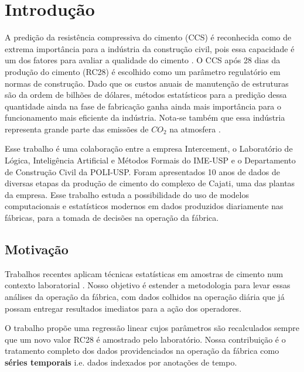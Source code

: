 \chapter{Introdução}
\label{cap:introducao}


A predição da resistência compressiva do cimento (CCS) é reconhecida como de
extrema importância para a indústria da construção civil, pois essa
capacidade é um dos fatores para avaliar a qualidade do cimento
\citep{cementml}. O CCS após 28 dias da produção do cimento (RC28) é escolhido
 como um parâmetro regulatório em normas de construção. Dado que os custos
 anuais de manutenção de estruturas são da ordem de bilhões de dólares, métodos
 estatísticos para a predição dessa quantidade ainda na fase de fabricação ganha ainda mais importância para o
 funcionamento mais eficiente da indústria. Nota-se também que essa  
 indústria representa grande parte das emissões de $CO_2$ na atmosfera \citep{cementroadmap}.

Esse trabalho é uma colaboração entre a empresa Intercement, o Laboratório de
Lógica, Inteligência Artificial e Métodos Formais do IME-USP e o Departamento de
Construção Civil da POLI-USP. Foram apresentados
10 anos de dados de diversas etapas da produção de cimento do complexo de
Cajati, uma das plantas da empresa. Esse trabalho estuda a possibilidade do uso
de modelos computacionais e estatísticos modernos em dados produzidos diariamente nas fábricas,
para a tomada de decisões na operação da fábrica.


\section {Motivação}



Trabalhos recentes aplicam técnicas estatísticas em amostras de cimento num
contexto laboratorial \citep{cementlin,nncement}.
Nosso objetivo é estender a metodologia para
levar essas análises da operação da fábrica, com dados colhidos na operação diária que já
possam entregar resultados imediatos para a ação dos operadores.

O trabalho \citep{dynstat} propõe uma regressão linear cujos parâmetros são recalculados
sempre que um novo valor RC28 é amostrado pelo laboratório. Nossa contribuição é
o tratamento completo dos dados providenciados na operação da fábrica como
\textbf{séries temporais} i.e. dados indexados por anotações de tempo.

